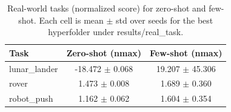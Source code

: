 \begin{table}[t]
\centering
\small
\caption{Real-world tasks (normalized score) for zero-shot and few-shot. Each cell is mean $\pm$ std over seeds for the best hyperfolder under results/real_task.}
\label{tab:duo-real-world}
\begin{tabular}{lcc}
\toprule
Task & Zero-shot (nmax) & Few-shot (nmax) \\
\midrule
lunar\_lander & -18.472 $\pm$ 0.068 & 19.207 $\pm$ 45.306 \\
rover & 1.473 $\pm$ 0.008 & 1.689 $\pm$ 0.360 \\
robot\_push & 1.162 $\pm$ 0.062 & 1.604 $\pm$ 0.354 \\
\bottomrule
\end{tabular}
\end{table}
